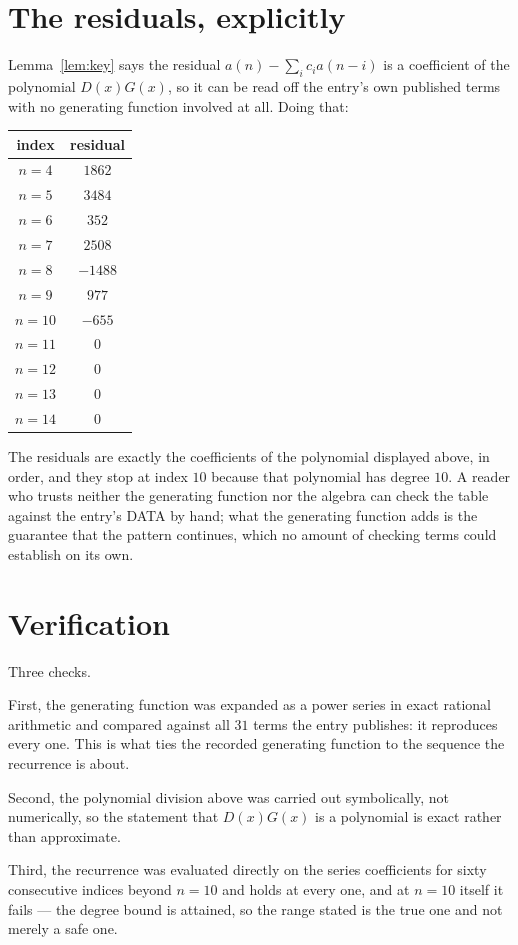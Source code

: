 \documentclass[11pt,a4paper]{article}
\theoremstyle{plain}
\theoremstyle{definition}
\begin{document}
\section{The residuals, explicitly}

Lemma~\ref{lem:key} says the residual $a(n)-\sum_ic_ia(n-i)$ is a coefficient of the
polynomial $D(x)G(x)$, so it can be read off the entry's own published terms with no
generating function involved at all. Doing that:
\begin{center}
\begin{tabular}{cc}
index & residual \\ \hline
$n=4$ & $1862$ \\
$n=5$ & $3484$ \\
$n=6$ & $352$ \\
$n=7$ & $2508$ \\
$n=8$ & $-1488$ \\
$n=9$ & $977$ \\
$n=10$ & $-655$ \\
$n=11$ & $0$ \\
$n=12$ & $0$ \\
$n=13$ & $0$ \\
$n=14$ & $0$
\end{tabular}
\end{center}
The residuals are exactly the coefficients of the polynomial displayed above, in order, and
they stop at index $10$ because that polynomial has degree $10$. A reader who trusts
neither the generating function nor the algebra can check the table against the entry's DATA
by hand; what the generating function adds is the guarantee that the pattern continues, which
no amount of checking terms could establish on its own.

\section{Verification}

Three checks.

First, the generating function was expanded as a power series in exact rational arithmetic and
compared against all $31$ terms the entry publishes: it reproduces every one. This is
what ties the recorded generating function to the sequence the recurrence is about.

Second, the polynomial division above was carried out symbolically, not numerically, so the
statement that $D(x)G(x)$ is a polynomial is exact rather than approximate.

Third, the recurrence was evaluated directly on the series coefficients for sixty consecutive
indices beyond $n=10$ and holds at every one, and at $n=10$ itself it fails --- the
degree bound is attained, so the range stated is the true one and not merely a safe one.
\end{document}
